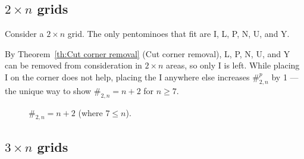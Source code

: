 \documentclass{article}
\theoremstyle{definition}%
\begin{document}
\subsection{\texorpdfstring{$2 \times n$}{2 \texttimes\ n} grids}

Consider a $2 \times n$ grid. The only pentominoes that fit are I, L, P, N, U, and Y.

By Theorem~\ref{th:Cut corner removal} (Cut corner removal), L, P, N, U, and Y can be removed from consideration in $2 \times n$ areas, so only I is left. While placing I on the corner does not help, placing the I anywhere else increases $\#^p_{2, n}$ by 1 --- the unique way to show $\#_{2, n} = n + 2$ for $n \ge 7$.

\begin{figure}[htbp!]
    \centering
    \caption{$\#_{2, n} = n + 2$ (where $7 \le n$). \cite{sheet}}
\end{figure}



\subsection{\texorpdfstring{$3 \times n$}{3 \texttimes\ n} grids}
\end{document}
